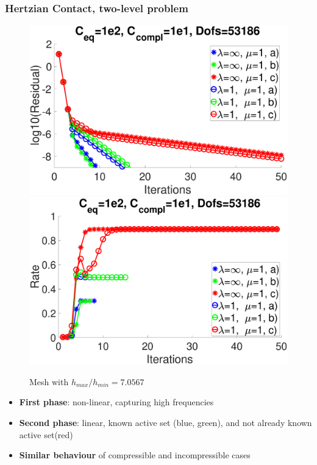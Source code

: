 \documentclass[8pt, oneside]{beamer}   	%
\newcommand{\titlecolor}[1]{\frametitle{\textcolor{dkgrey}{ \textbf{#1}}}}
\begin{document}
\begin{frame}
\titlecolor{Hertzian Contact, two-level problem}
\begin{figure}[htbp!]
	\includegraphics[scale=0.08]{img/ResidualsNonUniform.eps}
		\includegraphics[scale=0.08]{img/RatesNonUniform.eps}
	\caption{Mesh with $h_{max}/h_{min}=7.0567$}
		\label{ResidualRateVeryNonUniform}
\end{figure}
\begin{itemize}
\item \textbf{First phase}: non-linear, capturing high frequencies
\item \textbf{Second phase}: linear, known active set (blue, green), and not already known active set(red)
\item  \textbf{Similar behaviour} of compressible and incompressible cases
\end{itemize}
\end{frame}
\end{document}
